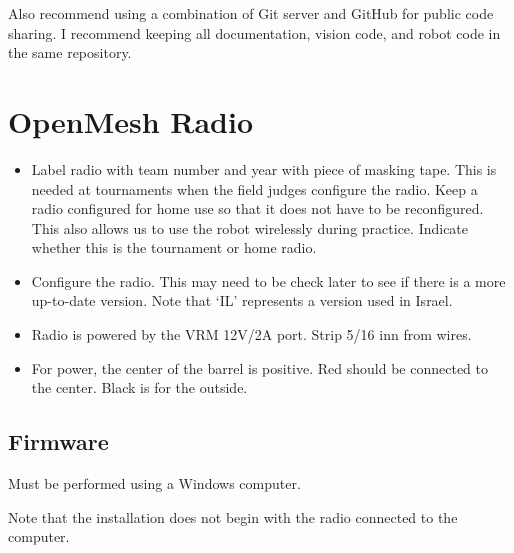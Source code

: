 Also recommend using a combination of Git server and GitHub for public code sharing.
%
I recommend keeping all documentation, vision code, and robot code in the same repository.



\newpage\section*{OpenMesh Radio}

\begin{itemize}
\item Label radio with team number and year with piece of masking tape. This is needed at tournaments when the field judges configure the radio. Keep a radio configured for home use so that it does not have to be reconfigured. This also allows us to use the robot wirelessly during practice. Indicate whether this is the tournament or home radio.

\item Configure the radio. This may need to be check later to see if there is a more up-to-date version. Note that `IL' represents a version used in Israel.

\item Radio is powered by the VRM 12V/2A port. Strip 5/16 inn from wires.

\item For power, the center of the barrel is positive. Red should be connected to the center. Black is for the outside.
\end{itemize}


\subsection*{Firmware}

Must be performed using a Windows computer.
 
Note that the installation does not begin with the radio connected to the computer.

